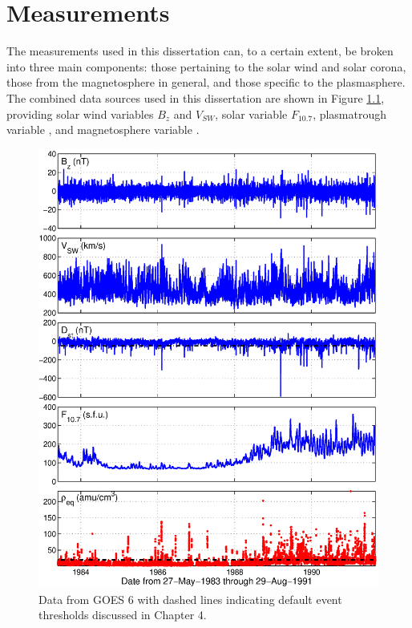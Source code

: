 \chapter[Measurements]{Measurements}


The measurements used in this dissertation can, to a certain extent, be broken into three main components: those pertaining to the solar wind and solar corona, those from the magnetosphere in general, and those specific to the plasmasphere. The combined data sources used in this dissertation are shown in Figure \ref{fig:alldata-GOES6-1983-1991}, providing solar wind variables $B_z$ and $V_{SW}$, solar variable $F_{10.7}$, plasmatrough variable \req, and magnetosphere variable \dst.

\begin{figure}[htp!]
	\centering
	\includegraphics[width=1\linewidth]{Figures/alldata-GOES6-1983-1991}
	\caption{Data from GOES 6 with dashed lines indicating default event thresholds discussed in Chapter 4.}
	\label{fig:alldata-GOES6-1983-1991}
\end{figure}

